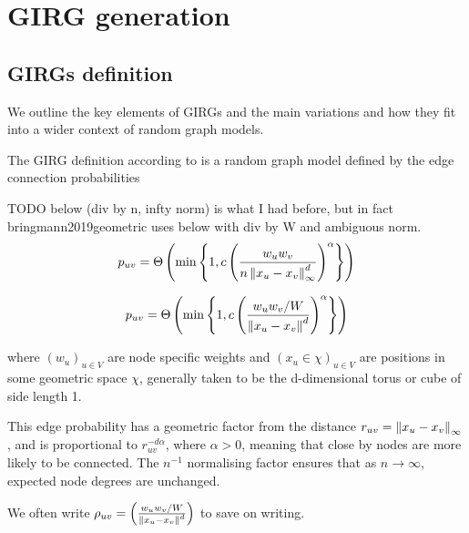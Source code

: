 \chapter{GIRG generation}
\section{GIRGs definition}
We outline the key elements of GIRGs and the main variations and how they fit into a wider context of random graph models.

The GIRG definition according to \cite{bringmann2019geometric} is a random graph model defined by the edge connection probabilities

TODO below (div by n, infty norm) is what I had before, but in fact bringmann2019geometric uses below with div by W and ambiguous norm.
\begin{equation}
    p_{uv} = \Theta \left ( \min \left \{ 
        1,
        c \left (
            \frac{w_u w_v}{ n \left\lVert x_u - x_v\right\rVert_\infty^d}
        \right )^\alpha    
    \right \}
    \right )
\end{equation}

\begin{equation}
    p_{uv} = \Theta \left ( \min \left \{ 
        1,
        c \left (
            \frac{w_u w_v / W}{\left\lVert x_u - x_v\right\rVert^d}
        \right )^\alpha    
    \right \}
    \right )
\end{equation}

where $(w_u)_{u \in V}$ are node specific weights and $(x_u \in \chi)_{u \in V}$ are positions in some geometric space $\chi$, generally taken to be the d-dimensional torus or cube of side length 1.

This edge probability has a geometric factor from the distance $r_{uv} = \left\lVert x_u - x_v\right\rVert_\infty$, and is proportional to $r_{uv}^{-d \alpha}$, where $\alpha > 0$, meaning that close by nodes are more likely to be connected. The $n^{-1}$ normalising factor ensures that as $n \to \infty$, expected node degrees are unchanged.

We often write $\rho_{uv} = \left ( \frac{w_u w_v / W}{\left\lVert x_u - x_v\right\rVert^d} \right )$ to save on writing.

